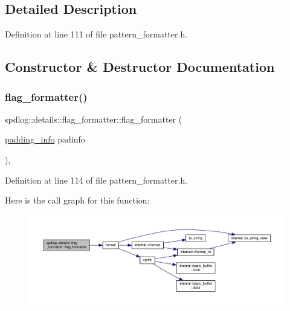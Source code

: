 \subsection{Detailed Description}


Definition at line 111 of file pattern\+\_\+formatter.\+h.



\subsection{Constructor \& Destructor Documentation}
\mbox{\label{classspdlog_1_1details_1_1flag__formatter_a7f775ab8ad4027546c3490f2f299bf43}} 
\subsubsection{\texorpdfstring{flag\+\_\+formatter()}{flag\_formatter()}\hspace{0.1cm}{\footnotesize\ttfamily [1/2]}}
{\footnotesize\ttfamily spdlog\+::details\+::flag\+\_\+formatter\+::flag\+\_\+formatter (\begin{DoxyParamCaption}\item[{\hyperlink{structspdlog_1_1details_1_1padding__info}{padding\+\_\+info}}]{padinfo }\end{DoxyParamCaption})\hspace{0.3cm}{\ttfamily [inline]}, {\ttfamily [explicit]}}



Definition at line 114 of file pattern\+\_\+formatter.\+h.

Here is the call graph for this function\+:
\nopagebreak
\begin{figure}[H]
\begin{center}
\leavevmode
\includegraphics[width=350pt]{classspdlog_1_1details_1_1flag__formatter_a7f775ab8ad4027546c3490f2f299bf43_cgraph}
\end{center}
\end{figure}
\mbox{\label{classspdlog_1_1details_1_1flag__formatter_a19fcada419b07c4c0db0080b0fbf8b46}} 
